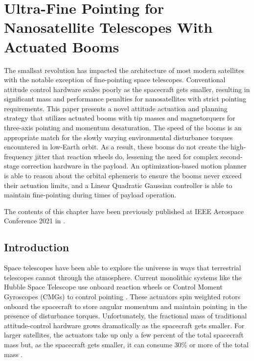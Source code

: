 \graphicspath{{wigglesat/}}


\chapter{Ultra-Fine Pointing for Nanosatellite Telescopes With Actuated Booms}
\label{sec:wigglesat}

The smallsat revolution has impacted the architecture of most modern satellites with the notable exception of fine-pointing space telescopes. Conventional attitude control hardware scales poorly as the spacecraft gets smaller, resulting in significant mass and performance penalties for nanosatellites with strict pointing requirements. This paper presents a novel attitude actuation and planning strategy that utilizes actuated booms with tip masses and magnetorquers for three-axis pointing and momentum desaturation. The speed of the booms is an appropriate match for the slowly varying environmental disturbance torques encountered in low-Earth orbit. As a result, these booms do not create the high-frequency jitter that reaction wheels do, lessening the need for complex second-stage correction hardware in the payload. An optimization-based motion planner is able to reason about the orbital ephemeris to ensure the booms never exceed their actuation limits, and a Linear Quadratic Gaussian controller is able to maintain fine-pointing during times of payload operation.

The contents of this chapter have been previously published at IEEE Aerospace Conference 2021 in \citet{tracy2022a}.

\section{Introduction}
Space telescopes have been able to explore the universe in ways that terrestrial telescopes cannot through the atmosphere. Current monolithic systems like the Hubble Space Telescope use onboard reaction wheels or Control Moment Gyroscopes (CMGs) to control pointing \cite{beals1988}. These actuators spin weighted rotors onboard the spacecraft to store angular momentum and maintain pointing in the presence of disturbance torques.  Unfortunately, the fractional mass of traditional attitude-control hardware grows dramatically as the spacecraft gets smaller. For larger satellites, the actuators take up only a few percent of the total spacecraft mass but, as the spacecraft gets smaller, it can consume 30\% or more of the total mass \cite{douglas2021}.%


